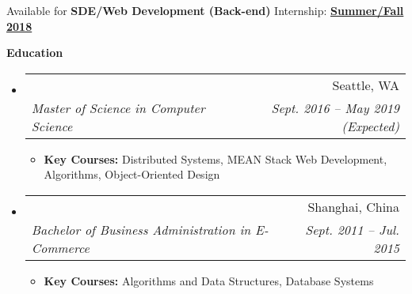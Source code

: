 \documentclass[letterpaper,11pt]{article}
\makeatletter
\newcommand{\resitem}[1]{\item #1 \vspace{-2pt}}
\newcommand{\resheading}[1]{{\large \colorbox{mygrey}{\begin{minipage}{\textwidth}{\textbf{#1 \vphantom{p\^{E}}}}\end{minipage}}}}
\newcommand{\ressubheading}[4]{
\begin{tabular*}{6.5in}{l@{\extracolsep{\fill}}r}
    \textbf{#1} & #2 \\
    \textit{#3} & \textit{#4} \\
\end{tabular*}\vspace{-6pt}}
\makeatother
\begin{document}
    {Available for
    \textbf{SDE/Web Development ({Back-end})} Internship:
    \textbf{\underline{Summer/Fall 2018}}



    \resheading{Education}
    \begin{itemize}
        \item[]
        \ressubheading  %
        {\href
        {http://www.northeastern.edu/seattle/}
        {Northeastern University - Seattle}
        }
        {Seattle, WA}
        {Master of Science in Computer Science}
        {Sept. 2016 -- May 2019 (Expected)}
        {\footnotesize
        \begin{itemize}
            \resitem{
            \textbf{Key Courses:} Distributed Systems, MEAN Stack Web Development,
            Algorithms, Object-Oriented Design
            }
        \end{itemize}
        }

        \item[]
        \ressubheading
        {\href
        {http://www.shnu.edu.cn/}
        {Shanghai Normal University}
        }
        {Shanghai, China}
        {Bachelor of Business Administration in E-Commerce}
        {Sept. 2011 -- Jul. 2015}
        {
        \footnotesize
        \begin{itemize}
            \resitem{
            \textbf{Key Courses:} Algorithms and Data Structures, Database Systems
            }
        \end{itemize}
        }

    \end{itemize}


}
\end{document}
